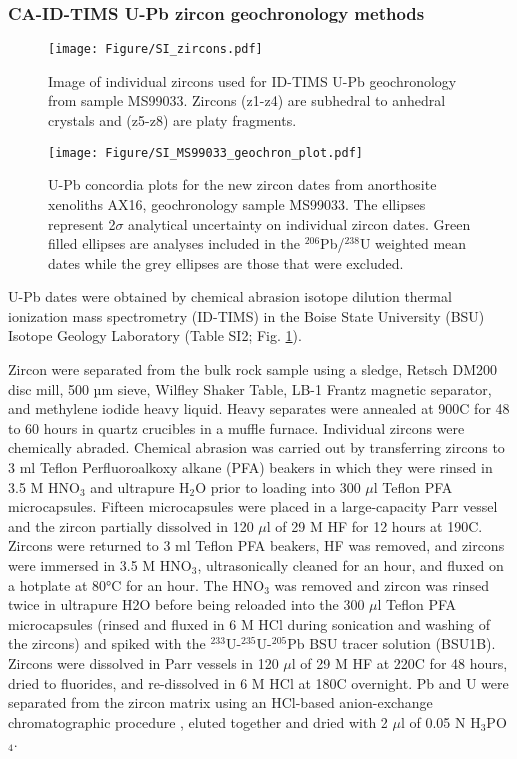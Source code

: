 \documentclass[11pt,letterpaper]{article}
\begin{document}
\subsubsection*{CA-ID-TIMS U-Pb zircon geochronology methods}

\begin{figure}[h!]
\noindent\texttt{[image: Figure/SI\_zircons.pdf]}
\centering
\caption{\footnotesize{Image of individual zircons used for ID-TIMS U-Pb geochronology from sample MS99033. Zircons (z1-z4) are subhedral to anhedral crystals and (z5-z8) are platy fragments.}}
\label{fig:zircon_image}
\end{figure}

\begin{figure}[h!]
\noindent\texttt{[image: Figure/SI\_MS99033\_geochron\_plot.pdf]}
\centering
\caption{\footnotesize{U-Pb concordia plots for the new zircon dates from anorthosite xenoliths AX16, geochronology sample MS99033. The ellipses represent 2$\sigma$ analytical uncertainty on individual zircon dates. Green filled ellipses are analyses included in the $^{206}$Pb/$^{238}$U weighted mean dates while the grey ellipses are those that were excluded. }}
\label{fig:zircon_concordia}
\end{figure}

U-Pb dates were obtained by chemical abrasion isotope dilution thermal ionization mass spectrometry (ID-TIMS) in the Boise State University (BSU) Isotope Geology Laboratory (Table SI2; Fig. \ref{fig:zircon_image}). 

Zircon were separated from the bulk rock sample using a sledge, Retsch DM200 disc mill, 500 µm sieve, Wilfley Shaker Table, LB-1 Frantz magnetic separator, and methylene iodide heavy liquid. Heavy separates were annealed at 900\textdegree C for 48 to 60 hours in quartz crucibles in a muffle furnace. Individual zircons were chemically abraded. Chemical abrasion was carried out by transferring zircons to 3 ml Teflon Perfluoroalkoxy alkane (PFA) beakers in which they were rinsed in 3.5 M HNO$_\mathrm{3}$ and ultrapure H$_\mathrm{2}$O prior to loading into 300 $\mu$l Teflon PFA microcapsules. Fifteen microcapsules were placed in a large-capacity Parr vessel and the zircon partially dissolved in 120 $\mu$l of 29 M HF for 12 hours at 190\textdegree C. Zircons were returned to 3 ml Teflon PFA beakers, HF was removed, and zircons were immersed in 3.5 M HNO$_\mathrm{3}$, ultrasonically cleaned for an hour, and fluxed on a hotplate at 80°C for an hour. The HNO$_\mathrm{3}$ was removed and zircon was rinsed twice in ultrapure H2O before being reloaded into the 300 $\mu$l Teflon PFA microcapsules (rinsed and fluxed in 6 M HCl during sonication and washing of the zircons) and spiked with the $^{233}$U-$^{235}$U-$^{205}$Pb BSU tracer solution (BSU1B). Zircons were dissolved in Parr vessels in 120 $\mu$l of 29 M HF at 220\textdegree C for 48 hours, dried to fluorides, and re-dissolved in 6 M HCl at 180\textdegree C overnight. Pb and U were separated from the zircon matrix using an HCl-based anion-exchange chromatographic procedure \citep{Krogh1973a}, eluted together and dried with 2 $\mu$l of 0.05 N H$_\mathrm{3}$PO$_\mathrm{4}$.
\end{document}
